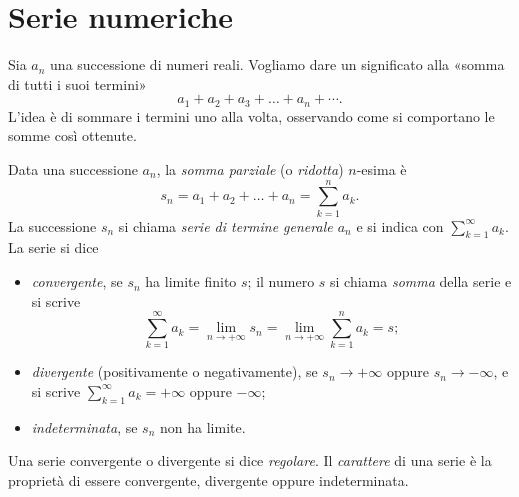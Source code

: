 \section{Serie numeriche}
\label{sec:serie-numeriche}

Sia $a_{n}$ una successione di numeri reali. Vogliamo dare un significato alla «somma di
tutti i suoi termini»
\begin{equation}\label{eq:serie-formale}
  a_{1}+a_{2}+a_{3}+\dots+a_{n}+\cdots .
\end{equation}
L'idea è di sommare i termini uno alla volta, osservando come si comportano le somme
così ottenute.

\begin{definizione}\label{def:serie}
Data una successione $a_{n}$, la \emph{somma parziale} (o \emph{ridotta}) $n$-esima è
\begin{equation}\label{eq:somma-parziale}
  s_{n}=a_{1}+a_{2}+\dots+a_{n}=\sum_{k=1}^{n}a_{k} .
\end{equation}
La successione $s_{n}$ si chiama \emph{serie di termine generale $a_{n}$} e si indica con
$\sum_{k=1}^{\infty}a_{k}$. La serie si dice
\begin{itemize}
  \item \emph{convergente}, se $s_{n}$ ha limite finito $s$; il numero $s$ si chiama
  \emph{somma} della serie e si scrive
  \begin{equation}\label{eq:somma-serie}
    \sum_{k=1}^{\infty}a_{k}=\lim_{n\to+\infty}s_{n}=\lim_{n\to+\infty}\sum_{k=1}^{n}a_{k}=s ;
  \end{equation}
  \item \emph{divergente} (positivamente o negativamente), se $s_{n}\to+\infty$ oppure
  $s_{n}\to-\infty$, e si scrive $\sum_{k=1}^{\infty}a_{k}=+\infty$ oppure $-\infty$;
  \item \emph{indeterminata}, se $s_{n}$ non ha limite.
\end{itemize}
Una serie convergente o divergente si dice \emph{regolare}. Il \emph{carattere} di una
serie è la proprietà di essere convergente, divergente oppure indeterminata.
\end{definizione}

